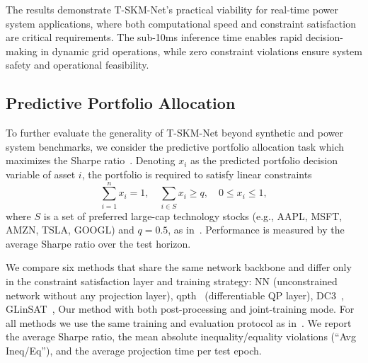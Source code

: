 \documentclass[letterpaper]{article} %
\begin{document}
The results demonstrate T-SKM-Net's practical viability for real-time power system applications, where both computational speed and constraint satisfaction are critical requirements. The sub-10ms inference time enables rapid decision-making in dynamic grid operations, while zero constraint violations ensure system safety and operational feasibility.

\subsection{Predictive Portfolio Allocation}

To further evaluate the generality of T-SKM-Net beyond synthetic and power system benchmarks, we consider the predictive portfolio allocation task which maximizes the Sharpe ratio~\cite{sharpeSharpeRatioFall1998}. Denoting $x_i$ as the predicted portfolio decision variable of asset $i$, the portfolio is required to satisfy linear constraints
\[
\sum_{i=1}^{n} x_i = 1,\quad \sum_{i\in S} x_i \ge q,\quad 0 \le x_i \le 1,
\]
where $S$ is a set of preferred large-cap technology stocks (e.g., AAPL, MSFT, AMZN, TSLA, GOOGL) and $q=0.5$, as in~\cite{zengGLinSATGeneralLinear2024}. Performance is measured by the average Sharpe ratio over the test horizon.

We compare six methods that share the same network backbone and differ only in the constraint satisfaction layer and training strategy: NN (unconstrained network without any projection layer), qpth~\cite{amosOptNetDifferentiableOptimization2017} (differentiable QP layer), DC3~\cite{dontiDC3LearningMethod2021}, GLinSAT~\cite{zengGLinSATGeneralLinear2024}, Our method with both post-processing and joint-training mode. For all methods we use the same training and evaluation protocol as in~\cite{zengGLinSATGeneralLinear2024}. We report the average Sharpe ratio, the mean absolute inequality/equality violations (``Avg Ineq/Eq''), and the average projection time per test epoch.
\end{document}
